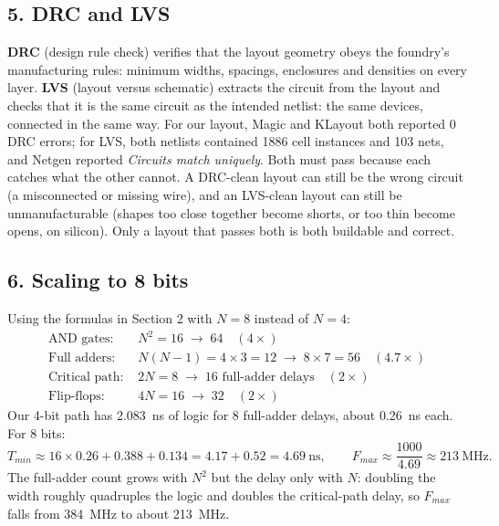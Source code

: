\documentclass[11pt,a4paper]{article}
\begin{document}
\subsection*{5. DRC and LVS}

\textbf{DRC} (design rule check) verifies that the layout geometry obeys the
foundry's manufacturing rules: minimum widths, spacings, enclosures and densities
on every layer. \textbf{LVS} (layout versus schematic) extracts the circuit from
the layout and checks that it is the same circuit as the intended netlist: the same
devices, connected in the same way. For our layout, Magic and KLayout both reported
0 DRC errors; for LVS, both netlists contained 1886 cell instances and 103 nets, and
Netgen reported \emph{Circuits match uniquely}. Both must pass because each catches
what the other cannot. A DRC-clean layout can still be the wrong circuit (a
misconnected or missing wire), and an LVS-clean layout can still be unmanufacturable
(shapes too close together become shorts, or too thin become opens, on silicon).
Only a layout that passes both is both buildable and correct.

\subsection*{6. Scaling to 8 bits}

Using the formulas in Section 2 with $N = 8$ instead of $N = 4$:
\begin{align*}
\text{AND gates: } & N^2 = 16 \;\rightarrow\; 64 \quad (4\times)\\
\text{Full adders: } & N(N-1) = 4 \times 3 = 12 \;\rightarrow\; 8 \times 7 = 56 \quad (4.7\times)\\
\text{Critical path: } & 2N = 8 \;\rightarrow\; 16 \text{ full-adder delays} \quad (2\times)\\
\text{Flip-flops: } & 4N = 16 \;\rightarrow\; 32 \quad (2\times)
\end{align*}
Our 4-bit path has 2.083~ns of logic for 8 full-adder delays, about 0.26~ns each.
For 8 bits:
\[
T_{min} \approx 16 \times 0.26 + 0.388 + 0.134 = 4.17 + 0.52 = 4.69~\text{ns},
\qquad F_{max} \approx \frac{1000}{4.69} \approx 213~\text{MHz}.
\]
The full-adder count grows with $N^2$ but the delay only with $N$: doubling the
width roughly quadruples the logic and doubles the critical-path delay, so
$F_{max}$ falls from 384~MHz to about 213~MHz.
\end{document}
